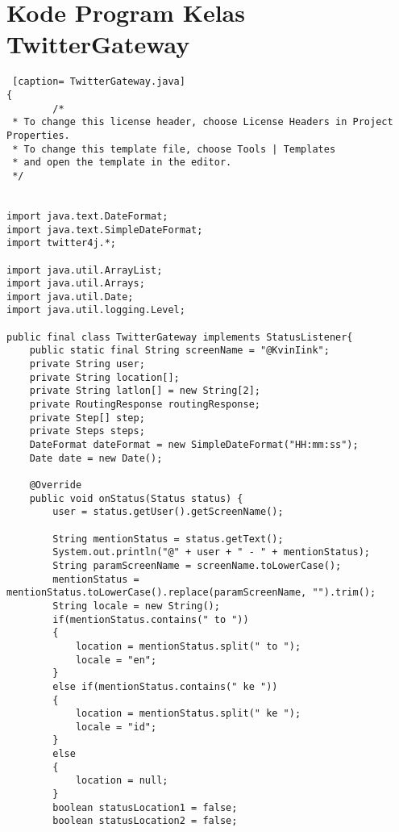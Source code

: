 \chapter{Kode Program Kelas TwitterGateway}
\label{Kode Program Kelas TwitterGateway}

\begin{lstlisting} [caption= TwitterGateway.java]
{ 
		/*
 * To change this license header, choose License Headers in Project Properties.
 * To change this template file, choose Tools | Templates
 * and open the template in the editor.
 */


import java.text.DateFormat;
import java.text.SimpleDateFormat;
import twitter4j.*;

import java.util.ArrayList;
import java.util.Arrays;
import java.util.Date;
import java.util.logging.Level;

public final class TwitterGateway implements StatusListener{
    public static final String screenName = "@KvinIink";
    private String user;
    private String location[];
    private String latlon[] = new String[2];
    private RoutingResponse routingResponse;
    private Step[] step;
    private Steps steps;
    DateFormat dateFormat = new SimpleDateFormat("HH:mm:ss");
    Date date = new Date();
    
    @Override
    public void onStatus(Status status) {
        user = status.getUser().getScreenName();
        
        String mentionStatus = status.getText();
        System.out.println("@" + user + " - " + mentionStatus);
        String paramScreenName = screenName.toLowerCase();
        mentionStatus = mentionStatus.toLowerCase().replace(paramScreenName, "").trim();
        String locale = new String();
        if(mentionStatus.contains(" to "))
        {
            location = mentionStatus.split(" to ");
            locale = "en";
        }
        else if(mentionStatus.contains(" ke "))
        {
            location = mentionStatus.split(" ke ");
            locale = "id";
        }
        else
        {
            location = null;
        }
        boolean statusLocation1 = false;
        boolean statusLocation2 = false;
        

\end{lstlisting}
